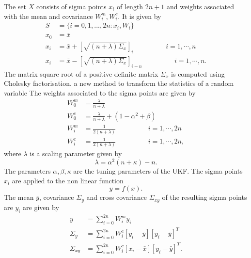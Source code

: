 The set $X$ consists of sigma points $x_i$ of length $2n+1$ and weights associated with the mean and covariance $W_i^m, W_i^c $. It is given by \citep{sim07} 
\begin{equation} 
    \label{eq:ut_sigma}
    \begin{split}
    S &= \{i= 0,1,...,2n:x_i,W_i \} \\
    x_0 &= \bar x \\ 
    x_i &= \bar x + \left[ \sqrt{(n+\lambda)\Sigma_x} \right ]_i \hspace{2cm} i = 1, \cdots ,n \\
    x_i &= \bar x - \left[ \sqrt{(n+\lambda)\Sigma_x} \right ]_{i-n} \hspace{2cm} i = 1, \cdots ,n . 
    \end{split}
\end{equation}
The matrix square root of a positive definite matrix $\Sigma_x$ is computed using Cholesky factorisation. 
a new method to transform the statistics of a random variable
The weights associated to the sigma points are given by 
\begin{equation}
    \label{eq:ut_weights}
    \begin{split}
    W_0^m &= \frac{\lambda}{n+\lambda} \\
    W_0^c &= \frac{\lambda}{n+\lambda} + ( 1 - \alpha^2 + \beta)\\
    W_i^m &= \frac{1}{2(n+\lambda)} \hspace{2cm} i = 1, \cdots, 2n \\
    W_i^c &= \frac{1}{2(n+\lambda)} \hspace{2cm} i = 1, \cdots, 2n ,
    \end{split}
\end{equation} 
where $\lambda$ is a scaling parameter given by $$ \lambda = \alpha^2(n+\kappa)-n. $$ The parameters $\alpha,\beta,\kappa$ are the tuning parameters of the UKF.
The sigma points $x_i$ are applied to the non linear function $$y= f(x).$$ The mean $\bar y$, covariance $\Sigma_y$ and cross covariance $\Sigma_{xy}$ of the resulting sigma points are $y_i$ are given by
\begin{equation}
    \label{eq:ut_mean_cov}
    \begin{split}
        \bar y &= \sum \limits_{i=0}^{2n} W_i^m y_i \\
        \Sigma_y &= \sum \limits_{i=0}^{2n} W_i^c [y_i - \bar y ] [ y_i - \bar y] ^T \\
        \Sigma_{xy} &= \sum \limits_{i=0}^{2n} W_i^c [x_i - \bar x ] [ y_i - \bar y] ^T .
    \end{split}
\end{equation}

